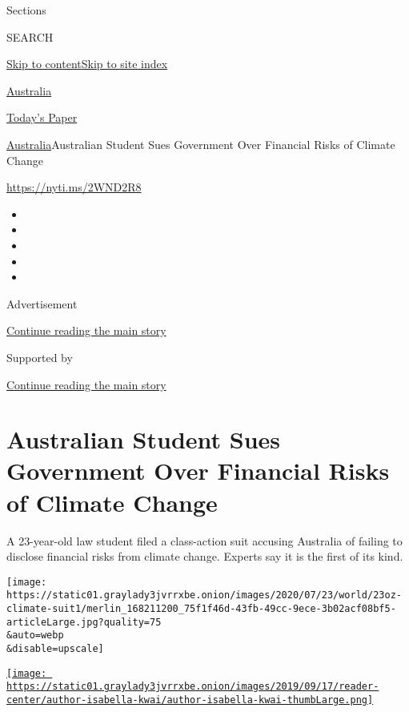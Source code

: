 Sections

SEARCH

\protect\hyperlink{site-content}{Skip to
content}\protect\hyperlink{site-index}{Skip to site index}

\href{https://www.nytimes3xbfgragh.onion/section/world/australia}{Australia}

\href{https://myaccount.nytimes3xbfgragh.onion/auth/login?response_type=cookie\&client_id=vi}{}

\href{https://www.nytimes3xbfgragh.onion/section/todayspaper}{Today's
Paper}

\href{/section/world/australia}{Australia}\textbar{}Australian Student
Sues Government Over Financial Risks of Climate Change

\url{https://nyti.ms/2WND2R8}

\begin{itemize}
\item
\item
\item
\item
\item
\end{itemize}

Advertisement

\protect\hyperlink{after-top}{Continue reading the main story}

Supported by

\protect\hyperlink{after-sponsor}{Continue reading the main story}

\hypertarget{australian-student-sues-government-over-financial-risks-of-climate-change}{%
\section{Australian Student Sues Government Over Financial Risks of
Climate
Change}\label{australian-student-sues-government-over-financial-risks-of-climate-change}}

A 23-year-old law student filed a class-action suit accusing Australia
of failing to disclose financial risks from climate change. Experts say
it is the first of its kind.

\texttt{[image: https://static01.graylady3jvrrxbe.onion/images/2020/07/23/world/23oz-climate-suit1/merlin\_168211200\_75f1f46d-43fb-49cc-9ece-3b02acf08bf5-articleLarge.jpg?quality=75\\\&auto=webp\\\&disable=upscale]}

\href{https://www.nytimes3xbfgragh.onion/by/isabella-kwai}{\texttt{[image: https://static01.graylady3jvrrxbe.onion/images/2019/09/17/reader-center/author-isabella-kwai/author-isabella-kwai-thumbLarge.png]}}

